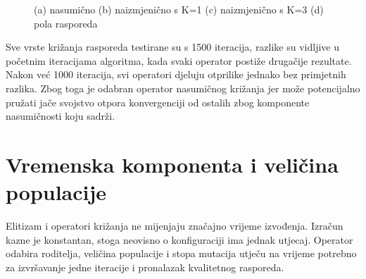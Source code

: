 \documentclass[times, utf8, zavrsni]{fer}
\begin{document}
\begin{figure}[htb]
    \centering
    \caption{(a) nasumično (b) naizmjenično s K=1 (c) naizmjenično s K=3 (d) pola rasporeda}
    \label{fig:krizanja}
\end{figure}

Sve vrste križanja rasporeda testirane su s 1500 iteracija, razlike su vidljive u početnim iteracijama algoritma, kada svaki operator postiže drugačije rezultate. Nakon već 1000 iteracija, svi operatori djeluju otprilike jednako bez primjetnih razlika. Zbog toga je odabran operator nasumičnog križanja jer može potencijalno pružati jače svojstvo otpora konvergenciji od ostalih zbog komponente nasumičnosti koju sadrži.

\section{Vremenska komponenta i veličina populacije}

Elitizam i operatori križanja ne mijenjaju značajno vrijeme izvođenja. Izračun kazne je konstantan, stoga neovisno o konfiguraciji ima jednak utjecaj. Operator odabira roditelja, veličina populacije i stopa mutacija utječu na vrijeme potrebno za izvršavanje jedne iteracije i pronalazak kvalitetnog rasporeda.
\end{document}
